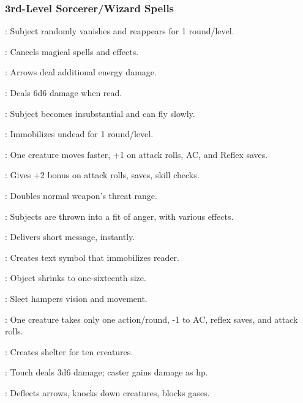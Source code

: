 \subsubsection{3rd-Level Sorcerer/Wizard Spells}
\begin{list}{}{\leftmargin=1em}
\item {}: Subject randomly vanishes and reappears for 1 round/level.
\item {}: Cancels magical spells and effects.
\item {}: Arrows deal additional energy damage.
\item {}: Deals 6d6 damage when read.
\item {}: Subject becomes insubstantial and can fly slowly.
\item {}: Immobilizes undead for 1 round/level.
\item {}: One creature moves faster, +1 on attack rolls, AC, and Reflex saves.
\item {}: Gives +2 bonus on attack rolls, saves, skill checks.
\item {}: Doubles normal weapon's threat range.
\item {}: Subjects are thrown into a fit of anger, with various effects.
\item {}: Delivers short message, instantly.
\item {}: Creates text symbol that immobilizes reader.
\item {}: Object shrinks to one-sixteenth size.
\item {}: Sleet hampers vision and movement.
\item {}: One creature takes only one action/round, -1 to AC, reflex saves, and attack rolls.
\item {}: Creates shelter for ten creatures.
\item {}: Touch deals 3d6 damage; caster gains damage as hp.
\item {}: Deflects arrows, knocks down creatures, blocks gases.
\end{list}
